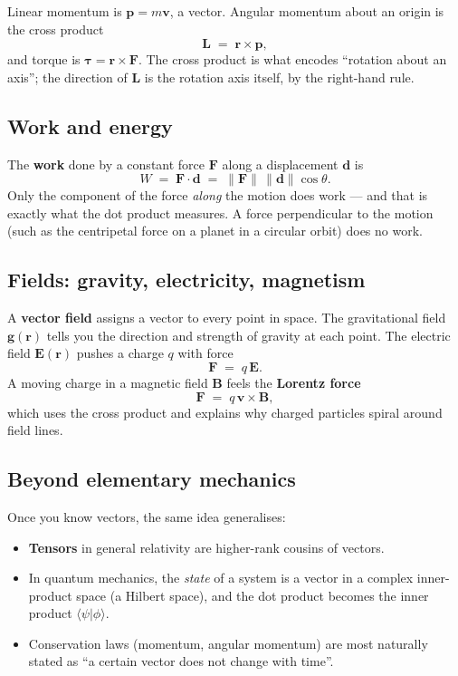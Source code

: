 \documentclass[11pt,a4paper]{article}
\newcommand{\vect}[1]{\boldsymbol{#1}}
\begin{document}
\begin{solutionblock}
Linear momentum is $\vect{p} = m\vect{v}$, a vector.
Angular momentum about an origin is the cross product
\[
  \vect{L} \;=\; \vect{r} \times \vect{p},
\]
and torque is $\vect{\tau} = \vect{r}\times\vect{F}$.
The cross product is what encodes ``rotation about an axis''; the direction of
$\vect{L}$ is the rotation axis itself, by the right-hand rule.
\end{solutionblock}

\subsection*{Work and energy}

\begin{solutionblock}
The \textbf{work} done by a constant force $\vect{F}$ along a displacement $\vect{d}$ is
\[
  W \;=\; \vect{F}\cdot\vect{d} \;=\; \lVert\vect{F}\rVert\,\lVert\vect{d}\rVert\cos\theta.
\]
Only the component of the force \emph{along} the motion does work --- and that is
exactly what the dot product measures. A force perpendicular to the motion
(such as the centripetal force on a planet in a circular orbit) does no work.
\end{solutionblock}

\subsection*{Fields: gravity, electricity, magnetism}

\begin{solutionblock}
A \textbf{vector field} assigns a vector to every point in space.
The gravitational field $\vect{g}(\vect{r})$ tells you the direction and strength of
gravity at each point. The electric field $\vect{E}(\vect{r})$ pushes a charge $q$
with force
\[
  \vect{F} \;=\; q\,\vect{E}.
\]
A moving charge in a magnetic field $\vect{B}$ feels the \textbf{Lorentz force}
\[
  \vect{F} \;=\; q\,\vect{v}\times\vect{B},
\]
which uses the cross product and explains why charged particles spiral around field lines.
\end{solutionblock}

\subsection*{Beyond elementary mechanics}

\begin{solutionblock}
Once you know vectors, the same idea generalises:
\begin{itemize}
  \item \textbf{Tensors} in general relativity are higher-rank cousins of vectors.
  \item In quantum mechanics, the \emph{state} of a system is a vector in a
        complex inner-product space (a Hilbert space), and the dot product
        becomes the inner product $\langle \psi | \phi \rangle$.
  \item Conservation laws (momentum, angular momentum) are most naturally
        stated as ``a certain vector does not change with time''.
\end{itemize}
\end{solutionblock}
\end{document}
